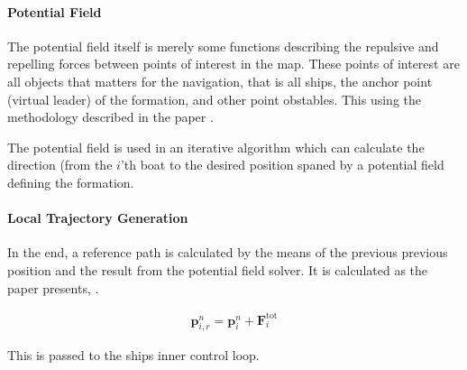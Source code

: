 \paragraph{Potential Field}
The potential field itself is merely some functions describing the
repulsive and repelling forces between points of interest in the map.
These points of interest are all objects that matters for the
navigation, that is all ships, the anchor point (virtual leader) of
the formation, and other point obstables. This using the methodology
described in the paper \citep{UAVff3dpf}.

The potential field is used in an iterative algorithm which can
calculate the direction (from the $i$'th boat to the desired position
spaned by a potential field defining the formation.

\paragraph{Local Trajectory Generation}
In the end, a reference path is calculated by the means of the
previous previous position and the result from the potential field
solver. It is calculated as the paper presents, \citep[eq.
48]{UAVff3dpf}.

\begin{align}
	\mathbf{p}_{i,r}^n = \mathbf{p}_i^n + \mathbf{F}_i ^\text{tot}
\end{align}

This is passed to the ships inner control loop.

